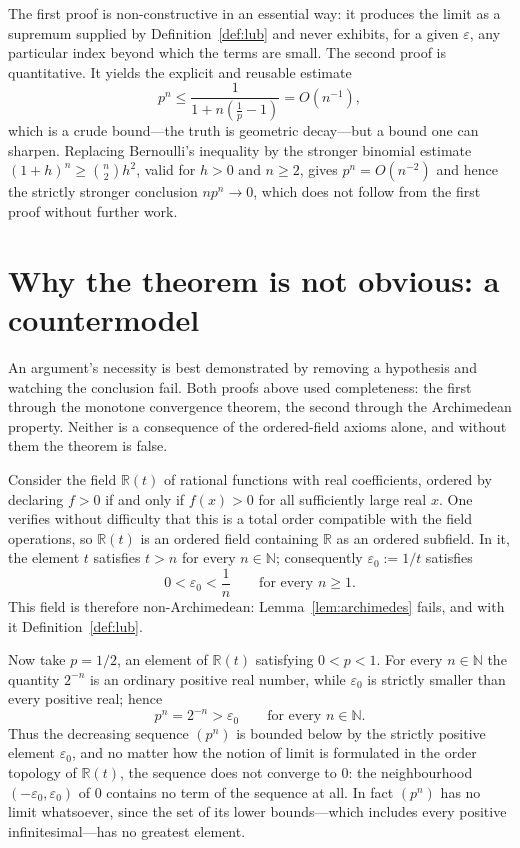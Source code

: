\documentclass{essay}
\begin{document}
\begin{remark}
The first proof is non-constructive in an essential way: it produces the limit as a
supremum supplied by Definition~\ref{def:lub} and never exhibits, for a given
$\varepsilon$, any particular index beyond which the terms are small. The second
proof is quantitative. It yields the explicit and reusable estimate
\[
  p^{n} \leq \frac{1}{1 + n\left(\tfrac{1}{p} - 1\right)} = O(n^{-1}),
\]
which is a crude bound---the truth is geometric decay---but a bound one can
sharpen. Replacing Bernoulli's inequality by the stronger binomial estimate
$(1+h)^{n} \geq \binom{n}{2} h^{2}$, valid for $h > 0$ and $n \geq 2$, gives
$p^{n} = O(n^{-2})$ and hence the strictly stronger conclusion $n p^{n} \to 0$,
which does not follow from the first proof without further work.
\end{remark}

\section{Why the theorem is not obvious: a countermodel}
\label{sec:counterexample}

An argument's necessity is best demonstrated by removing a hypothesis and watching
the conclusion fail. Both proofs above used completeness: the first through the
monotone convergence theorem, the second through the Archimedean property. Neither
is a consequence of the ordered-field axioms alone, and without them the theorem is
false.

Consider the field $\mathbb{R}(t)$ of rational functions with real coefficients,
ordered by declaring $f > 0$ if and only if $f(x) > 0$ for all sufficiently large
real $x$. One verifies without difficulty that this is a total order compatible with
the field operations, so $\mathbb{R}(t)$ is an ordered field containing $\mathbb{R}$
as an ordered subfield. In it, the element $t$ satisfies $t > n$ for every
$n \in \mathbb{N}$; consequently $\varepsilon_{0} := 1/t$ satisfies
\[
  0 < \varepsilon_{0} < \frac{1}{n} \qquad \text{for every } n \geq 1 .
\]
This field is therefore non-Archimedean: Lemma~\ref{lem:archimedes} fails, and with
it Definition~\ref{def:lub}.

Now take $p = 1/2$, an element of $\mathbb{R}(t)$ satisfying $0 < p < 1$. For every
$n \in \mathbb{N}$ the quantity $2^{-n}$ is an ordinary positive real number, while
$\varepsilon_{0}$ is strictly smaller than every positive real; hence
\[
  p^{n} = 2^{-n} > \varepsilon_{0} \qquad \text{for every } n \in \mathbb{N}.
\]
Thus the decreasing sequence $(p^{n})$ is bounded below by the strictly positive
element $\varepsilon_{0}$, and no matter how the notion of limit is formulated in
the order topology of $\mathbb{R}(t)$, the sequence does not converge to $0$: the
neighbourhood $(-\varepsilon_{0}, \varepsilon_{0})$ of $0$ contains no term of the
sequence at all. In fact $(p^{n})$ has no limit whatsoever, since the set of its
lower bounds---which includes every positive infinitesimal---has no greatest
element.
\end{document}

